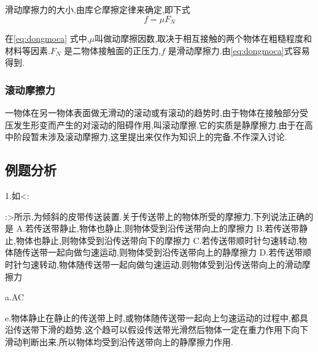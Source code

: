 滑动摩擦力的大小,由库仑摩擦定律来确定,即下式
\begin{equation}
  f=\mu F_N
  \label{eq:dongmoca}
\end{equation}

在\eqref{eq:dongmoca} 式中,$\mu$叫做动摩擦因数,取决于相互接触的两个物体在粗糙程度和材料等因素.$F_N$ 是二物体接触面的正压力,$f$ 是滑动摩擦力.由\eqref{eq:dongmoca}式容易得到.

\subsubsection{滚动摩擦力}
一物体在另一物体表面做无滑动的滚动或有滚动的趋势时,由于物体在接触部分受压发生形变而产生的对滚动的阻碍作用,叫滚动摩擦.它的实质是静摩擦力.由于在高中阶段暂未涉及滚动摩擦力,这里提出来仅作为知识上的完备,不作深入讨论.

\subsection{例题分析}

\begin{selection}
1.如<:
:>所示,为倾斜的皮带传送装置.关于传送带上的物体所受的摩擦力,下列说法正确的是
A.若传送带静止,物体也静止,则物体受到沿传送带向上的摩擦力
B.若传送带静止,物体也静止,则物体受到沿传送带向下的摩擦力
C.若传送带顺时针匀速转动,物体随传送带一起向做匀速运动,则物体受到沿传送带向上的静摩擦力
D.若传送带顺时针匀速转动,物体随传送带一起向做匀速运动,则物体受到沿传送带向上的滑动摩擦力
  
a.AC

e.物体静止在静止的传送带上时,或物体随传送带一起向上匀速运动的过程中,都具沿传送带下滑的趋势,这个趋可以假设传送带光滑然后物体一定在重力作用下向下滑动判断出来,所以物体均受到沿传送带向上的静摩擦力作用.

\end{selection}

